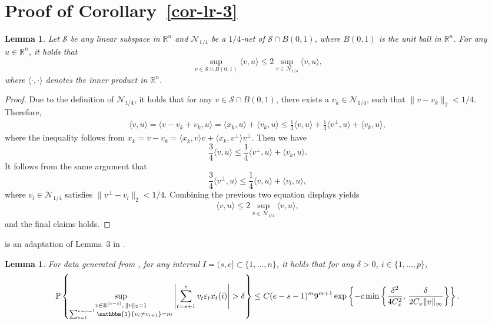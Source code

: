 \documentclass[twoside]{article}
\newtheorem{lemma}[theorem]{Lemma}
\begin{document}
\section{Proof of Corollary~\ref{cor-lr-3}}\label{sec-pf-cor-3}

\begin{lemma}
Let $\mathcal{S}$ be any linear subspace in $\mathbb{R}^n$ and $\mathcal{N}_{1/4}$	be a $1/4$-net of $\mathcal{S} \cap B(0, 1)$, where $B(0, 1)$ is the unit ball in $\mathbb{R}^n$.  For any $u \in \mathbb{R}^n$, it holds that
	\[
		\sup_{v \in \mathcal{S} \cap B(0, 1)} \langle v, u \rangle \leq 2 \sup_{v \in \mathcal{N}_{1/4}} \langle v, u \rangle,
	\]
	where $\langle \cdot, \cdot \rangle$ denotes the inner product in $\mathbb{R}^n$.
\end{lemma}

\begin{proof}
Due to the definition of $\mathcal{N}_{1/4}$, it holds that for any $v \in \mathcal{S} \cap B(0, 1)$, there exists a $v_k \in \mathcal{N}_{1/4}$, such that $\|v - v_k\|_2 < 1/4$.  Therefore,
	\begin{align*}
		\langle v, u \rangle = \langle v - v_k + v_k, u \rangle = \langle x_k, u \rangle + \langle v_k, u \rangle \leq \frac{1}{4} \langle v, u \rangle + \frac{1}{4} \langle v^{\perp}, u \rangle + \langle v_k, u \rangle,
	\end{align*}
	where the inequality follows from  $x_k = v - v_k = \langle x_k, v \rangle v + \langle x_k, v^{\perp} \rangle v^{\perp}$.  Then we have
	\[
		\frac{3}{4}\langle v, u \rangle \leq \frac{1}{4} \langle v^{\perp}, u \rangle + \langle v_k, u \rangle.
	\]
	It follows from the same argument that 
	\[
		\frac{3}{4}\langle v^{\perp}, u \rangle \leq \frac{1}{4} \langle v, u \rangle + \langle v_l, u \rangle,
	\]
	where $v_l \in \mathcal{N}_{1/4}$ satisfies $\|v^{\perp} - v_l\|_2 < 1/4$.  Combining the previous two equation displays yields
	\[
		\langle v, u \rangle \leq 2 \sup_{v \in \mathcal{N}_{1/4}} \langle v, u \rangle,
	\]
	and the final claims holds.
\end{proof}

 

 is an adaptation of Lemma~3 in \cite{wang2019statistically}.

\begin{lemma}\label{lem-wang-lem-3}
	For data generated from , for any interval $I = (s, e] \subset \{1, \ldots, n\}$, it holds that for any $\delta > 0$, $i \in \{1, \ldots, p\}$, 
	\[
		\mathbb{P}\left\{\sup_{\substack{v \in \mathbb{R}^{(e-s)}, \, \|v\|_2 = 1\\ \sum_{t = 1}^{e-s-1} \mathbbm{1}\{v_i \neq v_{i+1}\} = m}} \left|\sum_{t = s+1}^e v_t \varepsilon_t x_t(i)\right| > \delta \right\} \leq C(e-s-1)^m 9^{m+1} \exp \left\{-c \min\left\{\frac{\delta^2}{4C_x^2}, \, \frac{\delta}{2C_x \|v\|_{\infty}}\right\}\right\}.
	\]
\end{lemma}
\end{document}
